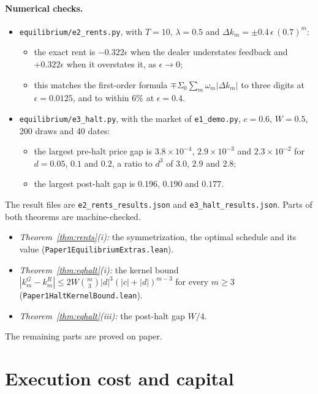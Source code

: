 \documentclass[12pt]{article}
\theoremstyle{definition}
\theoremstyle{remark}
\begin{document}
\paragraph{Numerical checks.}
\begin{itemize}[itemsep=1pt,topsep=2pt]
\item \nolinkurl{equilibrium/e2_rents.py}, with $T=10$, $\lambda=0.5$ and $\Delta k_m=\pm0.4\,\epsilon\,(0.7)^m$:
  \begin{itemize}[itemsep=1pt,topsep=1pt]
  \item the exact rent is $-0.322\epsilon$ when the dealer understates feedback and $+0.322\epsilon$ when it overstates it, as $\epsilon\to0$;
  \item this matches the first-order formula $\mp\Sigma_0\sum_m\omega_m|\Delta k_m|$ to three digits at $\epsilon=0.0125$, and to within 6\% at $\epsilon=0.4$.
  \end{itemize}
\item \nolinkurl{equilibrium/e3_halt.py}, with the market of \nolinkurl{e1_demo.py}, $c=0.6$, $W=0.5$, 200 draws and 40 dates:
  \begin{itemize}[itemsep=1pt,topsep=1pt]
  \item the largest pre-halt price gap is $3.8\times10^{-4}$, $2.9\times10^{-3}$ and $2.3\times10^{-2}$ for $d=0.05$, $0.1$ and $0.2$, a ratio to $d^3$ of $3.0$, $2.9$ and $2.8$;
  \item the largest post-halt gap is $0.196$, $0.190$ and $0.177$.
  \end{itemize}
\end{itemize}
The result files are \nolinkurl{e2_rents_results.json} and \nolinkurl{e3_halt_results.json}. Parts of both theorems are machine-checked.
\begin{itemize}[itemsep=1pt,topsep=2pt]
\item \emph{Theorem~\ref{thm:rents}(i):} the symmetrization, the optimal schedule and its value (\nolinkurl{Paper1EquilibriumExtras.lean}).
\item \emph{Theorem~\ref{thm:eqhalt}(i):} the kernel bound $|k^G_m-k^R_m|\le2W\binom m3|d|^3(|c|+|d|)^{m-3}$ for every $m\ge3$ (\nolinkurl{Paper1HaltKernelBound.lean}).
\item \emph{Theorem~\ref{thm:eqhalt}(iii):} the post-halt gap $W/4$.
\end{itemize}
The remaining parts are proved on paper.



\section{Execution cost and capital}\label{app:capital}
\end{document}

